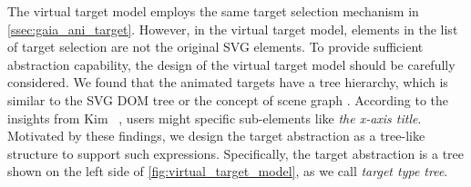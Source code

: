 
The virtual target model employs the same target selection mechanism in \autoref{ssec:gaia_ani_target}.
However, in the virtual target model, elements in the list of target selection are not the original SVG elements.
To provide sufficient abstraction capability, the design of the virtual target model should be carefully considered.
We found that the animated targets have a tree hierarchy, which is similar to the SVG DOM tree or the concept of scene graph \cite{satyanarayan2015reactive}.
According to the insights from Kim \etal~\cite{kim2020gemini}, users might specific sub-elements like \textit{the x-axis title}.
Motivated by these findings, we design the target abstraction as a tree-like structure to support such expressions. 
Specifically, the target abstraction is a tree shown on the left side of \autoref{fig:virtual_target_model}, as we call \textit{target type tree}.

